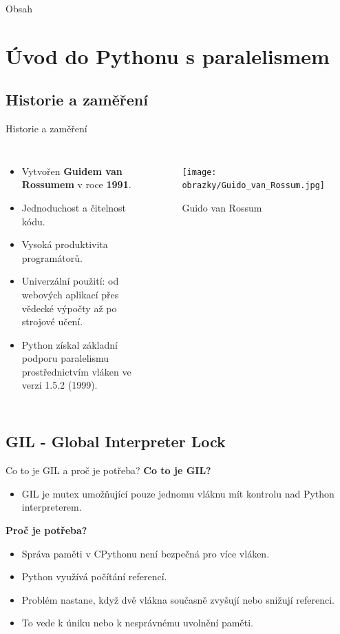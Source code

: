 \documentclass{beamer}
\title{\thesisname}
\author{\authorname}
\institute{Univerzita Palackého v Olomouci}
\date{\today}
\begin{document}
\begin{frame}
	\titlepage
\end{frame}

\begin{frame}{Obsah}
	\tableofcontents
\end{frame}

\section{Úvod do Pythonu s paralelismem}
\subsection{Historie a zaměření}
\begin{frame}{Historie a zaměření}
    \begin{columns}
        \begin{itemize}
            \item Vytvořen \textbf{Guidem van Rossumem} v roce \textbf{1991}.
            \item Jednoduchost a čitelnost kódu.
            \item Vysoká produktivita programátorů.
            \item Univerzální použití: od webových aplikací přes vědecké výpočty až po strojové učení.
            \item Python získal základní podporu paralelismu prostřednictvím vláken ve verzi 1.5.2 (1999).
        \end{itemize}
        
        \begin{figure}
        		\texttt{[image: obrazky/Guido\_van\_Rossum.jpg]}
        		\caption{Guido van Rossum}
      		\end{figure}
    \end{columns}
\end{frame}

\subsection{GIL - Global Interpreter Lock}
\begin{frame}{Co to je GIL a proč je potřeba?}
	\textbf{Co to je GIL?}
	\begin{itemize}
		\item GIL je mutex umožňující pouze jednomu vláknu mít kontrolu nad Python interpreterem.
	\end{itemize}
	\textbf{Proč je potřeba?}
	\begin{itemize}
		\item Správa paměti v CPythonu není bezpečná pro více vláken.
		\item Python využívá počítání referencí.
		\item Problém nastane, když dvě vlákna současně zvyšují nebo snižují referenci.
		\item To vede k úniku nebo k nesprávnému uvolnění paměti.
	\end{itemize}
\end{frame}
\end{document}
